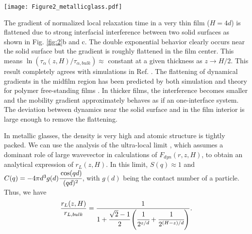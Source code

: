 \documentclass[twocolumn,preprintnumbers,amsmath,amssymb,superscriptaddress]{revtex4}
\begin{document}
\begin{figure*}[htp]
\texttt{[image: Figure2\_metallicglass.pdf]}
\caption{(Color online) (a) Natural logarithm of normalized local structural relaxation time in a  thin film having $H = 50d$ at different temperatures. $T_{g,bulk}$ is defined as $\tau_\alpha(T_{g,bulk}) = 100$ s. Natural logarithm of normalized mobility gradient at $T = 651 K$ and different film thickness (b) with and (c) without normalization by $H$.}
\label{fig:2}
\end{figure*}

The gradient of normalized local relaxation time in a very thin film ($H = 4d$) is flattened due to strong interfacial interference between two solid surfaces as shown in Fig. \ref{fig:2}b and c. The double exponential behavior clearly occurs near the solid surface but the gradient is roughly flattened in the film center. This means $\ln(\tau_\alpha(z,H)/\tau_{\alpha,bulk})\approx$ constant at a given thickness as $z\rightarrow H/2$. This result completely agrees with simulations in Ref. \cite{14}. The flattening of dynamical gradients in the midfilm region has been predicted by both simulation and theory for polymer free-standing films \cite{24}. In thicker films, the interference becomes smaller and the mobility gradient approximately behaves as if an one-interface system. The deviation between dynamics near the solid surface and in the film interior is large enough to remove the flattening.

In metallic glasses, the density is very high and atomic structure is tightly packed. We can use the analysis of the ultra-local limit \cite{12}, which assumes a dominant role of large wavevector in calculations of $F_{dyn}(r,z,H)$, to obtain an analytical expression of $r_L(z,H)$. In this limit, $S(q)\approx 1$ and $C(q) = -4\pi d^3 g(d)\cfrac{\cos(qd)}{(qd)^2}$, with $g(d)$ being the contact number of a particle. Thus, we have
\begin{eqnarray}
\frac{r_L(z,H)}{r_{L,bulk}} = \frac{1}{1+\cfrac{\sqrt{2}-1}{2}\left(\cfrac{1}{2^{z/d}}+\cfrac{1}{2^{(H-z)/d}}\right)}.
\label{eq:6}
\end{eqnarray}
\end{document}
